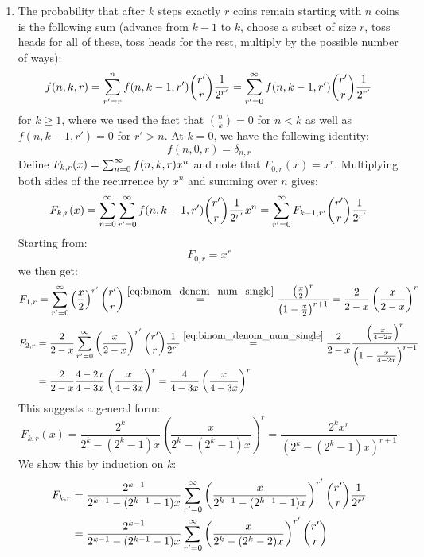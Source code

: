 \begin{solution}
    \begin{enumerate}[label=(\alph*)]
        \item The probability that after $k$ steps exactly $r$ coins remain starting with $n$ coins is the following sum (advance from $k-1$ to $k$, choose a subset of size $r$, toss heads for all of these, toss heads for the rest, multiply by the possible number of ways):
        \[
            f(n,k,r) = \sum_{r'=r}^{n} f(n, k - 1, r') \binom{r'}{r} \frac{1}{2^{r'}} =  \bsum[r'] f(n, k - 1, r') \binom{r'}{r} \frac{1}{2^{r'}}
        \]
        for $k\geq 1$, where we used the fact that $\binom{n}{k} = 0$ for $n < k$ as well as $f(n,k-1,r') = 0$ for $r'>n$. At $k=0$, we have the following identity:
        \[
            f(n,0,r) = \delta_{n,r}
        \]
        Define $F_{k,r}(x) = \bsum f(n,k,r) x^n$ and note that $F_{0,r}(x) = x^r$. Multiplying both sides of the recurrence by $x^n$ and summing over $n$ gives:
        \[
            F_{k,r}(x) = \bsum[n] \bsum[r'] f(n,k-1,r') \binom{r'}{r} \frac{1}{2^{r'}} x^n = \bsum[r'] F_{k-1,r'} \binom{r'}{r} \frac{1}{2^{r'}}
        \]
        Starting from:
        \[ 
            F_{0,r} = x^r 
        \]
        we then get:
        \[
            F_{1,r} = \bsum[r'] \left(\frac{x}{2}\right)^{r'} \binom{r'}{r} \estep{\eqref{eq:binom_denom_num_single}} \frac{\left(\frac{x}{2}\right)^r}{\left(1-\frac{x}{2}\right)^{r+1}} = \frac{2}{2-x} \left(\frac{x}{2-x}\right)^{r}
        \]
        \begin{align*}
            F_{2,r} &= \frac{2}{2-x}\bsum[r'] \left(\frac{x}{2-x}\right)^{r'} \binom{r'}{r} \frac{1}{2^{r'}} \estep{\eqref{eq:binom_denom_num_single}} \frac{2}{2-x} \frac{\left(\frac{x}{4-2x}\right)^r}{\left(1-\frac{x}{4-2x}\right)^{r+1}} \\
            &= \frac{2}{2-x}\frac{4-2x}{4-3x} \left(\frac{x}{4-3x}\right)^{r} = \frac{4}{4-3x}\left(\frac{x}{4-3x}\right)^{r}
        \end{align*}
        This suggests a general form:
        \[
            F_{k,r}(x) = \frac{2^{k}}{2^k - (2^k - 1)x}\left(\frac{x}{2^k - (2^k-1)x}\right)^r = \frac{2^k x^r}{(2^k - (2^k-1)x)^{r+1}}
        \]
        We show this by induction on $k$:
        \begin{align*}
            F_{k,r} &= \frac{2^{k-1}}{2^{k-1} - (2^{k-1} - 1)x} \bsum[r'] \left(\frac{x}{2^{k-1} - (2^{k-1}-1)x}\right)^{r'} \binom{r'}{r} \frac{1}{2^{r'}} \\
            &=\frac{2^{k-1}}{2^{k-1} - (2^{k-1} - 1)x} \bsum[r'] \left(\frac{x}{2^{k} - (2^{k}-2)x}\right)^{r'} \binom{r'}{r} \\

\end{align*}
\end{enumerate}
\end{solution}
